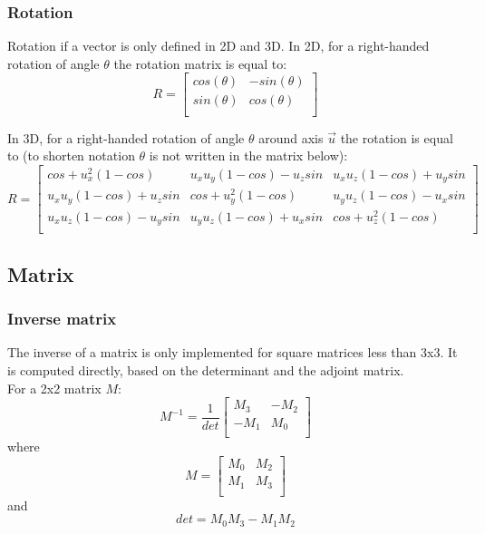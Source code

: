\subsubsection{Rotation}

Rotation if a vector is only defined in 2D and 3D. In 2D, for a right-handed rotation of angle $\theta$ the rotation matrix is equal to:\\

\begin{equation}
R=\left[
\begin{array}{cc}
cos(\theta)&-sin(\theta)\\
sin(\theta)&cos(\theta)\\
\end{array}
\right]
\end{equation}

In 3D, for a right-handed rotation of angle $\theta$ around axis $\overrightarrow{u}$ the rotation is equal to (to shorten notation $\theta$ is not written in the matrix below):\\

\begin{equation}
R=\left[
\begin{array}{ccc}
cos+u_x^2(1-cos)&u_xu_y(1-cos)-u_zsin&u_xu_z(1-cos)+u_ysin\\
u_xu_y(1-cos)+u_zsin&cos+u_y^2(1-cos)&u_yu_z(1-cos)-u_xsin\\
u_xu_z(1-cos)-u_ysin&u_yu_z(1-cos)+u_xsin&cos+u_z^2(1-cos)\\
\end{array}
\right]
\end{equation}

\subsection{Matrix}

\subsubsection{Inverse matrix}

The inverse of a matrix is only implemented for square matrices less than 3x3. It is computed directly, based on the determinant and the adjoint matrix.\\

For a 2x2 matrix $M$:\\

\begin{equation}
M^{-1}=\frac{1}{det}\left[\begin{array}{cc}
M_3&-M_2\\
-M_1&M_0\\
\end{array}\right]
\end{equation}
where
\begin{equation}
M=\left[\begin{array}{cc}
M_0&M_2\\
M_1&M_3\\
\end{array}\right]
\end{equation}
and
\begin{equation}
det=M_0M_3-M_1M_2
\end{equation}

